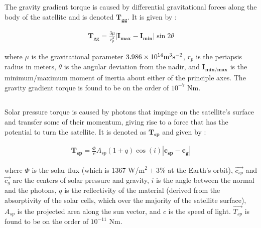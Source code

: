 \documentclass{article}
\begin{document}
\subsection{\color{black}{Gravity Gradient}}

The gravity gradient torque is caused by differential gravitational forces along the body of the satellite and is denoted $\mathbf{T_{gg}}$. It is given by \cite{nanostar}:

\begin{align}
    \mathbf{T_{gg}} = \frac{3 \mu}{r_{p}^3}|\mathbf{I_{max}}-\mathbf{I_{min}}|\sin{2 \theta} \tag{2.1}
\end{align}

 where $\mu$ is the gravitational parameter $3.986 \times 10^{14} \textup{m}^3 \textup{s}^{-2}$, $r_{p}$ is the periapsis radius in meters, $\theta$ is the angular deviation from the nadir, and $\mathbf{I_{min/max}}$ is the minimum/maximum moment of inertia about either of the principle axes. The gravity gradient torque is found to be on the order of $10^{-7}$ Nm.

\subsection{\color{black}{Solar Pressure}}

Solar pressure torque is caused by photons that impinge on the satellite's surface and transfer some of their momentum, giving rise to a force that has the potential to turn the satellite. It is denoted as $\mathbf{T_{sp}}$ and given by \cite{nanostar}:

\begin{align}
    \mathbf{T_{sp}} = \frac{\Phi}{c}A_{sp}(1+q)\cos{(i)}|\mathbf{c_{sp}} - \mathbf{c_{g}}| \tag{2.2}
\end{align}

 where $\Phi$ is the solar flux (which is 1367 W/m$^{2} \pm 3\%$ at the Earth's orbit), $\vec{c_{sp}}$ and $\vec{c_{g}}$ are the centers of solar pressure and gravity, $i$ is the angle between the normal and the photons, $q$ is the reflectivity of the material (derived from the absorptivity of the solar cells, which over the majority of the satellite surface), $A_{sp}$ is the projected area along the sun vector, and $c$ is the speed of light. $\vec{T_{sp}}$ is found to be on the order of $10^{-11}$ Nm.

\subsection{\color{black}{Aerodynamic Drag}}
\end{document}
